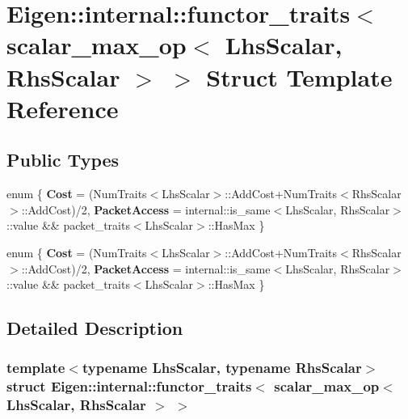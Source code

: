 \hypertarget{struct_eigen_1_1internal_1_1functor__traits_3_01scalar__max__op_3_01_lhs_scalar_00_01_rhs_scalar_01_4_01_4}{}\section{Eigen\+:\+:internal\+:\+:functor\+\_\+traits$<$ scalar\+\_\+max\+\_\+op$<$ Lhs\+Scalar, Rhs\+Scalar $>$ $>$ Struct Template Reference}
\label{struct_eigen_1_1internal_1_1functor__traits_3_01scalar__max__op_3_01_lhs_scalar_00_01_rhs_scalar_01_4_01_4}
\subsection*{Public Types}
\begin{DoxyCompactItemize}
\item 
\mbox{\label{struct_eigen_1_1internal_1_1functor__traits_3_01scalar__max__op_3_01_lhs_scalar_00_01_rhs_scalar_01_4_01_4_a942b1f3e2bd56e6b44766a260c114a27}} 
enum \{ {\bfseries Cost} = (Num\+Traits$<$Lhs\+Scalar$>$\+:\+:Add\+Cost+\+Num\+Traits$<$Rhs\+Scalar$>$\+:\+:Add\+Cost)/2, 
{\bfseries Packet\+Access} = internal\+:\+:is\+\_\+same$<$Lhs\+Scalar, Rhs\+Scalar$>$\+:\+:value \&\& packet\+\_\+traits$<$Lhs\+Scalar$>$\+:\+:Has\+Max
 \}
\item 
\mbox{\label{struct_eigen_1_1internal_1_1functor__traits_3_01scalar__max__op_3_01_lhs_scalar_00_01_rhs_scalar_01_4_01_4_a0918e913265425a848ca569a18a13334}} 
enum \{ {\bfseries Cost} = (Num\+Traits$<$Lhs\+Scalar$>$\+:\+:Add\+Cost+\+Num\+Traits$<$Rhs\+Scalar$>$\+:\+:Add\+Cost)/2, 
{\bfseries Packet\+Access} = internal\+:\+:is\+\_\+same$<$Lhs\+Scalar, Rhs\+Scalar$>$\+:\+:value \&\& packet\+\_\+traits$<$Lhs\+Scalar$>$\+:\+:Has\+Max
 \}
\end{DoxyCompactItemize}


\subsection{Detailed Description}
\subsubsection*{template$<$typename Lhs\+Scalar, typename Rhs\+Scalar$>$\newline
struct Eigen\+::internal\+::functor\+\_\+traits$<$ scalar\+\_\+max\+\_\+op$<$ Lhs\+Scalar, Rhs\+Scalar $>$ $>$}



